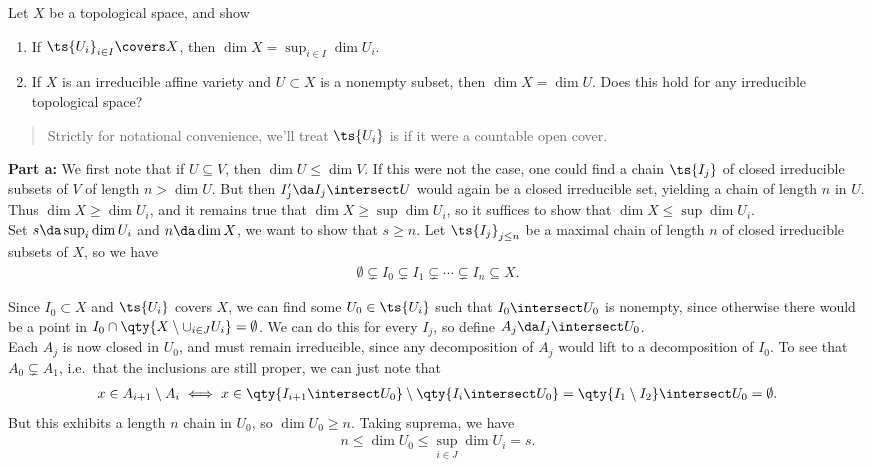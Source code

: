 \begin{exercise}[Gathmann 2.34]

Let \(X\) be a topological space, and show

\begin{enumerate}
\def\labelenumi{\alph{enumi}.}
\item
  If \(\ts{U_i}_{i\in I} \covers X\), then
  \(\dim X = \sup_{i\in I} \dim U_i\).
\item
  If \(X\) is an irreducible affine variety and \(U\subset X\) is a
  nonempty subset, then \(\dim X = \dim U\). Does this hold for any
  irreducible topological space?
\end{enumerate}

\end{exercise}

\begin{solution}

\begin{quote}
Strictly for notational convenience, we'll treat \(\ts{U_i}\) is if it
were a countable open cover.
\end{quote}

\textbf{Part a:} We first note that if \(U \subseteq V\), then
\(\dim U \leq \dim V\). If this were not the case, one could find a
chain \(\ts{I_j}\) of closed irreducible subsets of \(V\) of length
\(n>\dim U\). But then \(I'_j \da I_j \intersect U\) would again be a
closed irreducible set, yielding a chain of length \(n\) in \(U\). Thus
\(\dim X\geq \dim U_i\), and it remains true that
\(\dim X \geq \sup \dim U_i\), so it suffices to show that
\(\dim X \leq \sup \dim U_i\).\\

Set \(s \da \sup_i \dim U_i\) and \(n\da \dim X\), we want to show that
\(s\geq n\). Let \(\ts{I_j}_{j\leq n}\) be a maximal chain of length
\(n\) of closed irreducible subsets of \(X\), so we have
\begin{align*}  
\emptyset \subsetneq I_0 \subsetneq I_1 \subsetneq \cdots \subsetneq I_n \subseteq X
.\end{align*}

Since \(I_0\subset X\) and \(\ts{U_i}\) covers \(X\), we can find some
\(U_{0}\in \ts{U_i}\) such that \(I_0\intersect U_0\) is nonempty, since
otherwise there would be a point in
\(I_0 \cap \qty{X\setminus \cup_{i\in J} U_i} = \emptyset\). We can do
this for every \(I_j\), so define \(A_j \da I_j \intersect U_0\).\\

Each \(A_j\) is now closed in \(U_0\), and must remain irreducible,
since any decomposition of \(A_j\) would lift to a decomposition of
\(I_0\). To see that \(A_0 \subsetneq A_1\), i.e.~that the inclusions
are still proper, we can just note that
\begin{align*}  
x\in A_{i+1}\setminus A_i \iff x\in  
\qty{I_{i+1} \intersect U_0} \setminus 
\qty{I_{i} \intersect U_0} = \qty{I_1 \setminus I_2}\intersect U_0 = \emptyset
.\end{align*} But this exhibits a length \(n\) chain in \(U_0\), so
\(\dim U_0 \geq n\). Taking suprema, we have
\begin{align*}  
n \leq \dim U_0 \leq \sup_{i\in J} \dim U_i = s
.\end{align*}


\end{solution}

